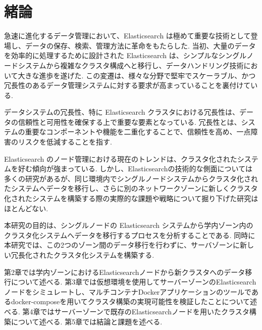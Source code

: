 \chapter{緒論}
\label{chap:first}

急速に進化するデータ管理において、Elasticsearch は極めて重要な技術として登場し、データの保存、検索、管理方法に革命をもたらした. 当初、大量のデータを効率的に処理するために設計された Elasticsearch は、シンプルなシングルノードシステムから複雑なクラスタ構成へと移行し、データハンドリング技術において大きな進歩を遂げた. この変遷は、様々な分野で堅牢でスケーラブル、かつ冗長性のあるデータ管理システムに対する要求が高まっていることを裏付けている. 

データシステムの冗長性、特に Elasticsearch クラスタにおける冗長性は、データの信頼性と可用性を確保する上で重要な要素となっている. 冗長性とは、システムの重要なコンポーネントや機能を二重化することで、信頼性を高め、一点障害のリスクを低減することを指す.

Elasticsearch のノード管理における現在のトレンドは、クラスタ化されたシステムを好む傾向が強まっている. しかし、Elasticsearchの技術的な側面については多くの研究があるが、同じ環境内でシングルノードシステムからクラスタ化されたシステムへデータを移行し、さらに別のネットワークゾーンに新しくクラスタ化されたシステムを構築する際の実際的な課題や戦略について掘り下げた研究はほとんどない. 

本研究の目的は、シングルノードの Elasticsearch システムから学内ゾーン内のクラスタ化システムへデータを移行するプロセスを分析することである. 同時に本研究では、この2つのゾーン間のデータ移行を行わずに、サーバゾーンに新しい冗長化されたクラスタ化システムを構築する. 

第2章では学内ゾーンにおけるElasticsearchノードから新クラスタへのデータ移行について述べる. 第3章では仮想環境を使用してサーバーゾーンのElasticsearchノードをシミュレートし、マルチコンテナDockerアプリケーションのツールであるdocker-composeを用いてクラスタ構築の実現可能性を検証したことについて述べる. 第4章ではサーバーゾーンで既存のElasticsearchノードを用いたクラスタ構築について述べる. 第5章では結論と課題を述べる. 